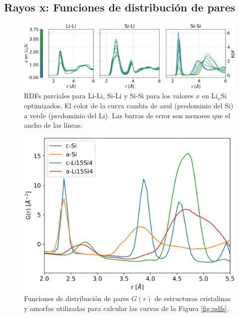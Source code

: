 \subsection{Rayos x: Funciones de distribución de pares}

\begin{figure}[h!]
    \centering
    \includegraphics[width=\textwidth]{Silicio/prediccion/resultados/xray/prdfs.png}
    \caption{RDFs parciales para Li-Li, Si-Li y Si-Si para los valores $x$ en 
    Li$_x$Si optimizados. El color de la curva cambia de azul (predominio del Si)
    a verde (predominio del Li). Las barras de error son menores que el ancho de 
    las líneas.}
    \label{fig:prdfs}
\end{figure}

\begin{figure}[h!]
    \centering
    \includegraphics[width=.7\textwidth]{Silicio/prediccion/resultados/xray/gofrs.png}
    \caption{Funciones de distribución de pares $G(r)$ de estructuras 
    cristalinas y amorfas utilizadas para calcular las curvas de la Figura 
    \ref{fig:pdfs}.}
    \label{fig:gofrs}
\end{figure}

